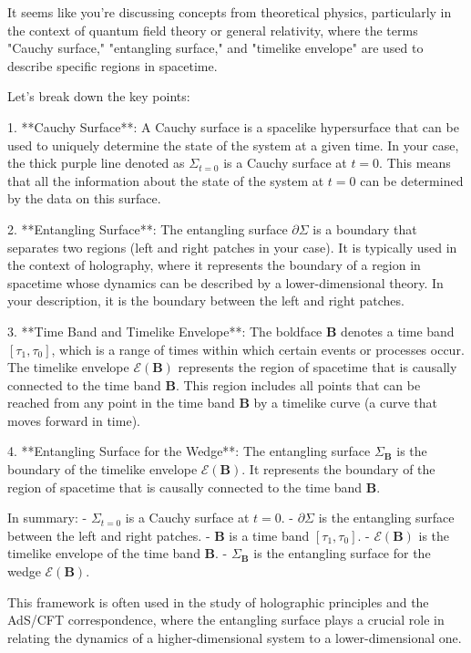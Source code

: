 It seems like you're discussing concepts from theoretical physics, particularly in the context of quantum field theory or general relativity, where the terms "Cauchy surface," "entangling surface," and "timelike envelope" are used to describe specific regions in spacetime.

Let's break down the key points:

1. **Cauchy Surface**: A Cauchy surface is a spacelike hypersurface that can be used to uniquely determine the state of the system at a given time. In your case, the thick purple line denoted as \(\Sigma_{t=0}\) is a Cauchy surface at \(t=0\). This means that all the information about the state of the system at \(t=0\) can be determined by the data on this surface.

2. **Entangling Surface**: The entangling surface \(\partial \Sigma\) is a boundary that separates two regions (left and right patches in your case). It is typically used in the context of holography, where it represents the boundary of a region in spacetime whose dynamics can be described by a lower-dimensional theory. In your description, it is the boundary between the left and right patches.

3. **Time Band and Timelike Envelope**: The boldface \(\mathbf{B}\) denotes a time band \([\tau_1, \tau_0]\), which is a range of times within which certain events or processes occur. The timelike envelope \(\mathcal{E}(\mathbf{B})\) represents the region of spacetime that is causally connected to the time band \(\mathbf{B}\). This region includes all points that can be reached from any point in the time band \(\mathbf{B}\) by a timelike curve (a curve that moves forward in time).

4. **Entangling Surface for the Wedge**: The entangling surface \(\Sigma_{\mathbf{B}}\) is the boundary of the timelike envelope \(\mathcal{E}(\mathbf{B})\). It represents the boundary of the region of spacetime that is causally connected to the time band \(\mathbf{B}\).

In summary:
- \(\Sigma_{t=0}\) is a Cauchy surface at \(t=0\).
- \(\partial \Sigma\) is the entangling surface between the left and right patches.
- \(\mathbf{B}\) is a time band \([\tau_1, \tau_0]\).
- \(\mathcal{E}(\mathbf{B})\) is the timelike envelope of the time band \(\mathbf{B}\).
- \(\Sigma_{\mathbf{B}}\) is the entangling surface for the wedge \(\mathcal{E}(\mathbf{B})\).

This framework is often used in the study of holographic principles and the AdS/CFT correspondence, where the entangling surface plays a crucial role in relating the dynamics of a higher-dimensional system to a lower-dimensional one.